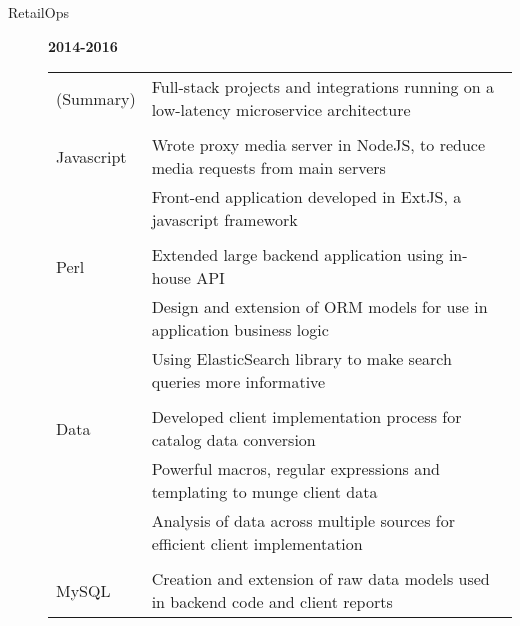 \documentclass[12pt]{article}
\begin{document}
\begin{description}
\begin{description}
                \item[RetailOps] \hfill \textbf{2014-2016}\\
                    \begin{tabular}{l|l}
                        (Summary)  & Full-stack projects and integrations running on a low-latency microservice architecture\\
				\\[-1.7mm]
                        Javascript & Wrote proxy media server in NodeJS, to reduce media requests from main servers \\
				   & Front-end application developed in ExtJS, a javascript framework\\
				\\[-1.7mm]
                        Perl       & Extended large backend application using in-house API \\
                                   & Design and extension of ORM models for use in application business logic \\
                                   & Using ElasticSearch library to make search queries more informative\\
				\\[-1.7mm]
                        Data       & Developed client implementation process for catalog data conversion\\
                                   & Powerful macros, regular expressions and templating to munge client data\\
                                   & Analysis of data across multiple sources for efficient client implementation\\
				\\[-1.7mm]
                        MySQL      & Creation and extension of raw data models used in backend code and client reports\\
                    \end{tabular}
            \end{description}


\end{description}
\end{document}
